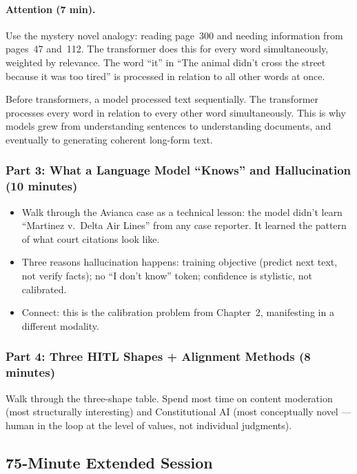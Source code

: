 \paragraph{Attention (7 min).}
Use the mystery novel analogy: reading page~300 and needing information from pages~47 and~112. The transformer does this for every word simultaneously, weighted by relevance. The word ``it'' in ``The animal didn't cross the street because it was too tired'' is processed in relation to all other words at once.

\begin{keyconcept}
Before transformers, a model processed text sequentially. The transformer processes every word in relation to every other word simultaneously. This is why models grew from understanding sentences to understanding documents, and eventually to generating coherent long-form text.
\end{keyconcept}

\subsubsection{Part 3: What a Language Model ``Knows'' and Hallucination (10 minutes)}

\begin{itemize}
    \item Walk through the Avianca case as a technical lesson: the model didn't learn ``Martinez v.\ Delta Air Lines'' from any case reporter. It learned the pattern of what court citations look like.
    \item Three reasons hallucination happens: training objective (predict next text, not verify facts); no ``I don't know'' token; confidence is stylistic, not calibrated.
    \item Connect: this is the calibration problem from Chapter~2, manifesting in a different modality.
\end{itemize}

\subsubsection{Part 4: Three HITL Shapes + Alignment Methods (8 minutes)}

Walk through the three-shape table. Spend most time on content moderation (most structurally interesting) and Constitutional AI (most conceptually novel --- human in the loop at the level of values, not individual judgments).

\subsection{75-Minute Extended Session}

